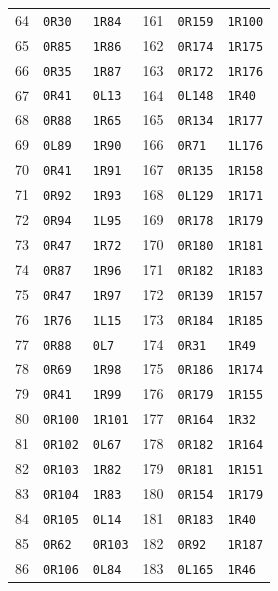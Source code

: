 \begin{longtable}{@{}rll@{\hspace{2em}}rll@{}}
64 & \texttt{0R30} & \texttt{1R84} & 161 & \texttt{0R159} & \texttt{1R100}\\
65 & \texttt{0R85} & \texttt{1R86} & 162 & \texttt{0R174} & \texttt{1R175}\\
66 & \texttt{0R35} & \texttt{1R87} & 163 & \texttt{0R172} & \texttt{1R176}\\
67 & \texttt{0R41} & \texttt{0L13} & 164 & \texttt{0L148} & \texttt{1R40}\\
68 & \texttt{0R88} & \texttt{1R65} & 165 & \texttt{0R134} & \texttt{1R177}\\
69 & \texttt{0L89} & \texttt{1R90} & 166 & \texttt{0R71} & \texttt{1L176}\\
70 & \texttt{0R41} & \texttt{1R91} & 167 & \texttt{0R135} & \texttt{1R158}\\
71 & \texttt{0R92} & \texttt{1R93} & 168 & \texttt{0L129} & \texttt{1R171}\\
72 & \texttt{0R94} & \texttt{1L95} & 169 & \texttt{0R178} & \texttt{1R179}\\
73 & \texttt{0R47} & \texttt{1R72} & 170 & \texttt{0R180} & \texttt{1R181}\\
74 & \texttt{0R87} & \texttt{1R96} & 171 & \texttt{0R182} & \texttt{1R183}\\
75 & \texttt{0R47} & \texttt{1R97} & 172 & \texttt{0R139} & \texttt{1R157}\\
76 & \texttt{1R76} & \texttt{1L15} & 173 & \texttt{0R184} & \texttt{1R185}\\
77 & \texttt{0R88} & \texttt{0L7} & 174 & \texttt{0R31} & \texttt{1R49}\\
78 & \texttt{0R69} & \texttt{1R98} & 175 & \texttt{0R186} & \texttt{1R174}\\
79 & \texttt{0R41} & \texttt{1R99} & 176 & \texttt{0R179} & \texttt{1R155}\\
80 & \texttt{0R100} & \texttt{1R101} & 177 & \texttt{0R164} & \texttt{1R32}\\
81 & \texttt{0R102} & \texttt{0L67} & 178 & \texttt{0R182} & \texttt{1R164}\\
82 & \texttt{0R103} & \texttt{1R82} & 179 & \texttt{0R181} & \texttt{1R151}\\
83 & \texttt{0R104} & \texttt{1R83} & 180 & \texttt{0R154} & \texttt{1R179}\\
84 & \texttt{0R105} & \texttt{0L14} & 181 & \texttt{0R183} & \texttt{1R40}\\
85 & \texttt{0R62} & \texttt{0R103} & 182 & \texttt{0R92} & \texttt{1R187}\\
86 & \texttt{0R106} & \texttt{0L84} & 183 & \texttt{0L165} & \texttt{1R46}\\

\end{longtable}
